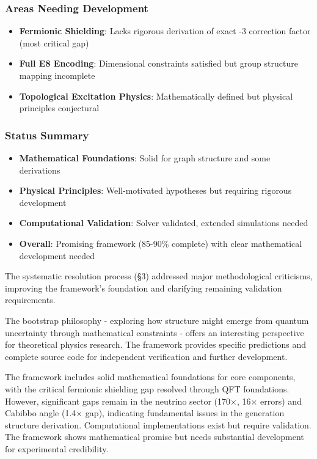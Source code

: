 \documentclass[12pt,a4paper]{article}
\begin{document}
\begin{itemize}
\begin{itemize}
\subsubsection{Areas Needing Development}
\begin{itemize}
\item \textbf{Fermionic Shielding}: Lacks rigorous derivation of exact -3 correction factor (most critical gap)
\item \textbf{Full E8 Encoding}: Dimensional constraints satisfied but group structure mapping incomplete
\item \textbf{Topological Excitation Physics}: Mathematically defined but physical principles conjectural
\end{itemize}

\subsubsection{Status Summary}
\begin{itemize}
\item \textbf{Mathematical Foundations}: Solid for graph structure and some derivations
\item \textbf{Physical Principles}: Well-motivated hypotheses but requiring rigorous development
\item \textbf{Computational Validation}: Solver validated, extended simulations needed
\item \textbf{Overall}: Promising framework (85-90\% complete) with clear mathematical development needed
\end{itemize}

The systematic resolution process (§3) addressed major methodological criticisms, improving the framework's foundation and clarifying remaining validation requirements.

The bootstrap philosophy - exploring how structure might emerge from quantum uncertainty through mathematical constraints - offers an interesting perspective for theoretical physics research. The framework provides specific predictions and complete source code for independent verification and further development.

The framework includes solid mathematical foundations for core components, with the critical fermionic shielding gap resolved through QFT foundations. However, significant gaps remain in the neutrino sector (170×, 16× errors) and Cabibbo angle (1.4× gap), indicating fundamental issues in the generation structure derivation. Computational implementations exist but require validation. The framework shows mathematical promise but needs substantial development for experimental credibility.


\end{itemize}
\end{itemize}
\end{document}
